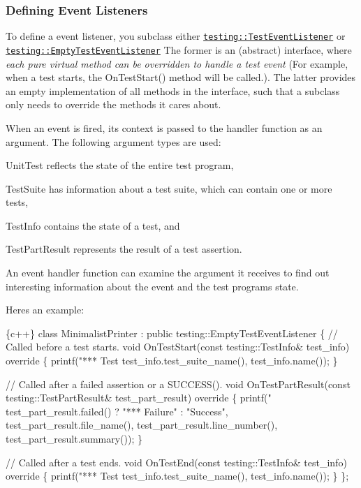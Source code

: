 \subsubsection*{Defining Event Listeners}

To define a event listener, you subclass either \href{reference/testing.md#TestEventListener}{\tt {\ttfamily testing\+::\+Test\+Event\+Listener}} or \href{reference/testing.md#EmptyTestEventListener}{\tt {\ttfamily testing\+::\+Empty\+Test\+Event\+Listener}} The former is an (abstract) interface, where {\itshape each pure virtual method can be overridden to handle a test event} (For example, when a test starts, the {\ttfamily On\+Test\+Start()} method will be called.). The latter provides an empty implementation of all methods in the interface, such that a subclass only needs to override the methods it cares about.

When an event is fired, its context is passed to the handler function as an argument. The following argument types are used\+:


\begin{DoxyItemize}
\item Unit\+Test reflects the state of the entire test program,
\item Test\+Suite has information about a test suite, which can contain one or more tests,
\item Test\+Info contains the state of a test, and
\item Test\+Part\+Result represents the result of a test assertion.
\end{DoxyItemize}

An event handler function can examine the argument it receives to find out interesting information about the event and the test program\textquotesingle{}s state.

Here\textquotesingle{}s an example\+:


\begin{DoxyCode}
\{c++\}
  class MinimalistPrinter : public testing::EmptyTestEventListener \{
    // Called before a test starts.
    void OnTestStart(const testing::TestInfo& test\_info) override \{
      printf("*** Test %
             test\_info.test\_suite\_name(), test\_info.name());
    \}

    // Called after a failed assertion or a SUCCESS().
    void OnTestPartResult(const testing::TestPartResult& test\_part\_result) override \{
      printf("%
             test\_part\_result.failed() ? "*** Failure" : "Success",
             test\_part\_result.file\_name(),
             test\_part\_result.line\_number(),
             test\_part\_result.summary());
    \}

    // Called after a test ends.
    void OnTestEnd(const testing::TestInfo& test\_info) override \{
      printf("*** Test %
             test\_info.test\_suite\_name(), test\_info.name());
    \}
  \};
\end{DoxyCode}


